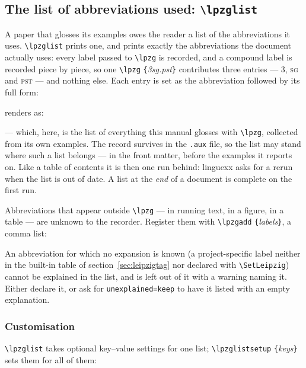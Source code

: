 \documentclass[11pt,a4paper]{article}
\newcommand{\cs}[1]{\texttt{\textbackslash #1}}
\newcommand{\pkg}[2][]{\textsf{#2}}
\newcommand{\opt}[1]{\texttt{#1}}
\newcommand{\meta}[1]{\textrm{\itshape\textlangle#1\textrangle}}
\newcommand{\marg}[1]{\penalty300 \texttt{\{}\meta{#1}\texttt{\}}}
\newcommand{\rendered}{\par\medskip\noindent\textcolor{gray!70}{\small renders as:}\par\nobreak\smallskip}
\newcommand{\afterex}{\par\addvspace{\medskipamount}}
\begin{document}
\subsection{The list of abbreviations used: \cs{lpzglist}}
\label{sec:lpzglist}
A paper that glosses its examples owes the reader a list of the
abbreviations it uses. \cs{lpzglist} prints one, and prints exactly the
abbreviations the document actually uses: every label passed to
\cs{lpzg} is recorded, and a compound label is recorded piece by piece, so
one \cs{lpzg}\marg{3sg.pst} contributes three entries --- \textsc{3},
\textsc{sg} and \textsc{pst} --- and nothing else. Each entry is set as
the abbreviation followed by its full form:

\begin{code}
\lpzglist
\end{code}

\rendered
\lpzglist

\afterex
\noindent --- which, here, is the list of everything this manual glosses
with \cs{lpzg}, collected from its own examples. The record survives in
the \texttt{.aux} file, so the list may
stand where such a list belongs --- in the front matter, before the
examples it reports on. Like a table of contents it is then one run
behind: \pkg{linguexx} asks for a rerun when the list is out of date. A
list at the \emph{end} of a document is complete on the first run.

Abbreviations that appear outside \cs{lpzg} --- in running text, in a
figure, in a table --- are unknown to the recorder. Register them with
\cs{lpzgadd}\marg{labels}, a comma list:

\begin{code}
\end{code}

\noindent An abbreviation for which no expansion is known (a
project-specific label neither in the built-in table of
section~\ref{sec:leipzigtag} nor declared with \cs{SetLeipzig}) cannot be
explained in the list, and is left out of it with a warning naming it.
Either declare it, or ask for \opt{unexplained=keep} to have it listed
with an empty explanation.

\subsubsection*{Customisation}
\cs{lpzglist} takes optional key--value settings for one list;
\cs{lpzglistsetup}\marg{keys} sets them for all of them:
\end{document}
